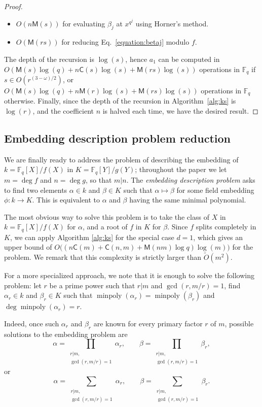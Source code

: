 \documentclass[12pt]{article}
\theoremstyle{plain}
\theoremstyle{definition}
\newcommand{\tildO}{\tilde{O}}
\DeclareMathOperator{\minpoly}{minpoly}
\def\F{\ensuremath{\mathbb{F}}}
\def\MM{\ensuremath{\mathsf{M}}}
\def\CC{\ensuremath{\mathsf{C}}}
\begin{document}
\begin{proof}
\begin{itemize}
	\item $O(n\MM(s))$ for evaluating $\beta_j$ at $x^{q^j}$ using Horner's method.
	\item $O(\MM(rs))$ for reducing Eq.~\eqref{equation:betaj} modulo $f$.
\end{itemize}
The depth of the recursion is $\log(s)$, hence $a_1$ can be computed in $O(\MM(s)\log(q) + 
n\CC(s)\log(s) + \MM(rs)\log(s))$ operations in $\F_q$ if $s \in O(r^{(3 - \omega) / 2})$, or
$O(\MM(s)\log(q) + n\MM(r)\log(s) + \MM(rs)\log(s))$ operations in $\F_q$ otherwise. Finally, since 
the depth of the recursion in Algorithm~\ref{alg:ks} is $\log(r)$, and the coefficient $n$ is 
halved each time, we have the desired result.
\end{proof}

\subsection{Embedding description problem reduction}

We are finally ready to address the problem of describing the embedding of
$k=\F_q[X]/f(X)$ in $K=\F_q[Y]/g(Y)$; throughout the paper we let $m=\deg f$ and
$n=\deg g$, so that $m|n$. The \emph{embedding description problem}
asks to find two elements $\alpha\in k$ and $\beta\in K$ such that
$\alpha\mapsto\beta$ for some field embedding $\phi:k\to K$. This is
equivalent to $\alpha$ and $\beta$ having the same minimal polynomial.

The most obvious way to solve this problem is to take the class of $X$
in $k=\F_q[X]/f(X)$ for $\alpha$, and a root of $f$ in $K$ for
$\beta$. Since $f$ splits completely in $K$, we can apply Algorithm
\ref{alg:ks} for the special case $d = 1$, which gives an upper bound
of $O\bigl((n\CC(m) + \CC(n,m) + \MM(nm)\log q)\log(m)\bigr)$ for the
problem. We remark that this complexity is strictly larger than
$\tildO(m^2)$.

For a more specialized approach, we note that it is enough to solve
the following problem: let $r$ be a prime power such that $r|m$ and
$\gcd(r,m/r)=1$, find $\alpha_r\in k$ and $\beta_r\in K$ such that
$\minpoly(\alpha_r)=\minpoly(\beta_r)$ and $\deg\minpoly(\alpha_r)=r$.

Indeed, once such $\alpha_r$ and $\beta_r$ are known for every primary
factor $r$ of $m$, possible solutions to the embedding problem are
\begin{equation*}
  \alpha = \prod_{\substack{r|m,\\\gcd(r,m/r)=1}}\alpha_r,\qquad
  \beta = \prod_{\substack{r|m,\\\gcd(r,m/r)=1}}\beta_r,
\end{equation*}
or
\begin{equation*}
  \alpha = \sum_{\substack{r|m,\\\gcd(r,m/r)=1}}\alpha_r,\qquad
  \beta = \sum_{\substack{r|m,\\\gcd(r,m/r)=1}}\beta_r.
\end{equation*}
\end{document}
